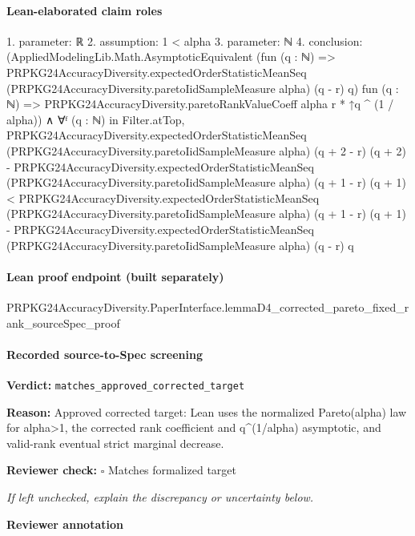\documentclass[10pt]{article}
\newcommand{\reviewerbox}{%
  \par\noindent\fbox{\parbox{0.96\linewidth}{\rule{0pt}{0.38in}}}\par
}
\newcommand{\reviewmatch}[1]{%
  \par\noindent\textbf{Reviewer check:} $\square$\; #1\par
  \noindent\emph{If left unchecked, explain the discrepancy or uncertainty below.}\par
}
\begin{document}
\paragraph{Lean-elaborated claim roles}\begin{ReviewVerbatim}
1. parameter: ℝ
2. assumption: 1 < alpha
3. parameter: ℕ
4. conclusion: (AppliedModelingLib.Math.AsymptoticEquivalent
    (fun (q : ℕ) =>
      PRPKG24AccuracyDiversity.expectedOrderStatisticMeanSeq (PRPKG24AccuracyDiversity.paretoIidSampleMeasure alpha)
        (q - r) q)
    fun (q : ℕ) => PRPKG24AccuracyDiversity.paretoRankValueCoeff alpha r * ↑q ^ (1 / alpha)) ∧
  ∀ᶠ (q : ℕ) in Filter.atTop,
    PRPKG24AccuracyDiversity.expectedOrderStatisticMeanSeq (PRPKG24AccuracyDiversity.paretoIidSampleMeasure alpha)
          (q + 2 - r) (q + 2) -
        PRPKG24AccuracyDiversity.expectedOrderStatisticMeanSeq (PRPKG24AccuracyDiversity.paretoIidSampleMeasure alpha)
          (q + 1 - r) (q + 1) <
      PRPKG24AccuracyDiversity.expectedOrderStatisticMeanSeq (PRPKG24AccuracyDiversity.paretoIidSampleMeasure alpha)
          (q + 1 - r) (q + 1) -
        PRPKG24AccuracyDiversity.expectedOrderStatisticMeanSeq (PRPKG24AccuracyDiversity.paretoIidSampleMeasure alpha)
          (q - r) q
\end{ReviewVerbatim}

\paragraph{Lean proof endpoint (built separately)}\begin{ReviewVerbatim}
PRPKG24AccuracyDiversity.PaperInterface.lemmaD4_corrected_pareto_fixed_rank_sourceSpec_proof
\end{ReviewVerbatim}

\paragraph{Recorded source-to-Spec screening}
\textbf{Verdict:} \texttt{matches\_approved\_corrected\_target}
\\
{\raggedright
\textbf{Reason:} Approved corrected target:\allowbreak{} Lean uses the normalized Pareto(alpha) law for alpha>1, the corrected rank coefficient and q\textasciicircum{}(1/\allowbreak{}alpha) asymptotic, and valid-\allowbreak{}rank eventual strict marginal decrease.\allowbreak{}
\par}
\reviewmatch{Matches formalized target}
\noindent\textbf{Reviewer annotation}\par
\reviewerbox
\clearpage
\hypertarget{source-claim-477ea495052a0969}{}
\end{document}
